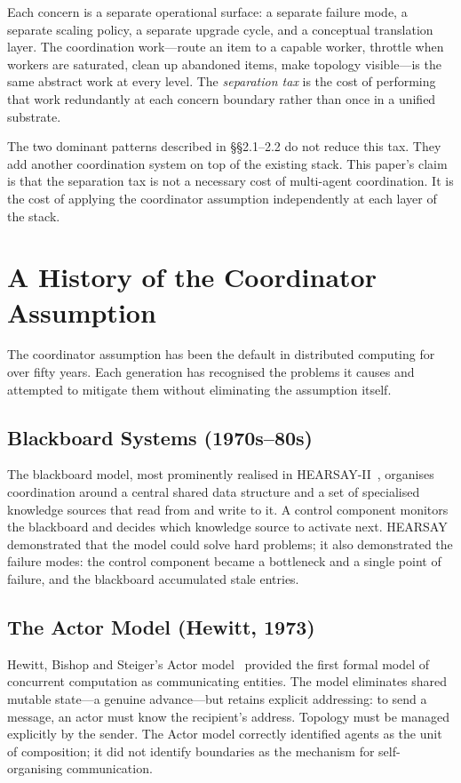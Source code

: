 \documentclass[11pt]{article}
\begin{document}
Each concern is a separate operational surface: a separate failure mode, a
separate scaling policy, a separate upgrade cycle, and a conceptual translation
layer. The coordination work---route an item to a capable worker, throttle when
workers are saturated, clean up abandoned items, make topology visible---is the
same abstract work at every level. The \emph{separation tax} is the cost of
performing that work redundantly at each concern boundary rather than once in a
unified substrate.

The two dominant patterns described in \S\S2.1--2.2 do not reduce this tax. They
add another coordination system on top of the existing stack. This paper's claim
is that the separation tax is not a necessary cost of multi-agent coordination. It
is the cost of applying the coordinator assumption independently at each layer of
the stack.

\section{A History of the Coordinator Assumption}

The coordinator assumption has been the default in distributed computing for over
fifty years. Each generation has recognised the problems it causes and attempted
to mitigate them without eliminating the assumption itself.

\subsection{Blackboard Systems (1970s--80s)}

The blackboard model, most prominently realised in HEARSAY-II~\cite{hearsay},
organises coordination around a central shared data structure and a set of
specialised knowledge sources that read from and write to it. A control component
monitors the blackboard and decides which knowledge source to activate next.
HEARSAY demonstrated that the model could solve hard problems; it also
demonstrated the failure modes: the control component became a bottleneck and a
single point of failure, and the blackboard accumulated stale entries.

\subsection{The Actor Model (Hewitt, 1973)}

Hewitt, Bishop and Steiger's Actor model~\cite{hewitt} provided the first formal
model of concurrent computation as communicating entities. The model eliminates
shared mutable state---a genuine advance---but retains explicit addressing: to
send a message, an actor must know the recipient's address. Topology must be
managed explicitly by the sender. The Actor model correctly identified agents as
the unit of composition; it did not identify boundaries as the mechanism for
self-organising communication.
\end{document}
